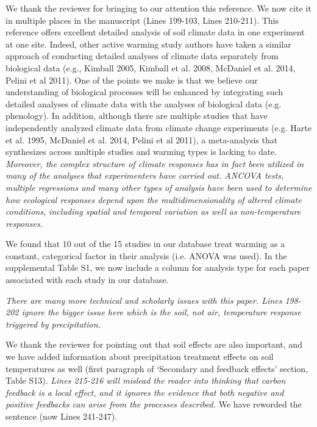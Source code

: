 \documentclass[11pt,a4paper]{letter}
\begin{document}
We thank the reviewer for bringing to our attention this reference. We now cite it in multiple places in the manuscript (Lines 199-103, Lines 210-211). This reference offers excellent detailed analysis of soil climate data in one experiment at one site. Indeed, other active warming study authors have taken a similar approach of conducting detailed analyses of climate data separately from biological data (e.g., Kimball 2005, Kimball et al. 2008, McDaniel et al. 2014, Pelini et al 2011). One of the points we make is that we believe our understanding of biological processes will be enhanced by integrating such detailed analyses of climate data with the analyses of biological data (e.g. phenology). In addition, although there are multiple studies that have independently analyzed climate data from climate change experiments (e.g. Harte et al. 1995, McDaniel et al. 2014, Pelini et al 2011), a meta-analysis that synthesizes across multiple studies and warming types is lacking to date.\\

\emph{Moreover, the complex structure of climate responses has in fact been utilized in many of the analyses that experimenters have carried out.  ANCOVA tests, multiple regressions and many other types of analysis have been used to determine how ecological responses depend upon the multidimensionality of altered climate conditions, including spatial and temporal variation as well as non-temperature responses.}

We found that 10 out of the 15 studies in our database treat warming as a constant, categorical factor in their analysis (i.e. ANOVA was used). In the supplemental Table S1,   
we now include a column for analysis type for each paper associated with each study in our database. 
\par \emph{There are many more technical and scholarly issues with this paper.  Lines 198-202 ignore the bigger issue here which is the soil, not air, temperature response triggered by precipitation.}
\par We thank the reviewer for pointing out that soil effects are also important, and we have added information about precipitation treatment effects on soil temperatures as well (first paragraph of `Secondary and feedback effects' section, Table S13).
\emph  {Lines 215-216 will mislead the reader into thinking that carbon feedback is a local effect, and it ignores the evidence that both negative and positive feedbacks can arise from the processes described.}  
We have reworded the sentence (now Lines 241-247).
\end{document}
